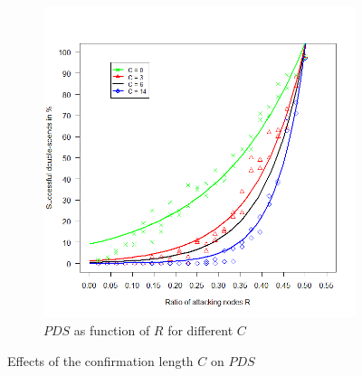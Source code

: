\documentclass[a4paper,12pt,twoside]{report}
\begin{document}
\begin{figure}[hb!]
\begin{subfigure}{.5\textwidth}
  \includegraphics[width=\linewidth]{Experiments/Confirmations/confrat.png}
  \caption{$PDS$ as function of $R$ for different $C$}
  \label{conf:b}
\end{subfigure}
\caption{Effects of the confirmation length $C$ on $PDS$}
\label{conf}
\end{figure}
\end{document}
